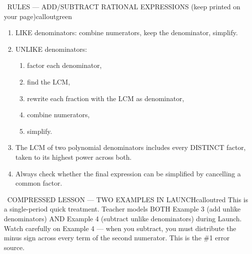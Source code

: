 \documentclass[11pt]{article}
\begin{document}
\begin{callout}{\IconBook\ RULES --- ADD/SUBTRACT RATIONAL EXPRESSIONS (keep printed on your page)}{calloutgreen}
\begin{enumerate}[leftmargin=2.1em,itemsep=1pt,topsep=3pt]
  \item LIKE denominators: combine numerators, keep the denominator, simplify.
  \item UNLIKE denominators:
  \begin{enumerate}[label=(\alph*),leftmargin=1.8em,itemsep=1pt,topsep=2pt]
    \item factor each denominator,
    \item find the LCM,
    \item rewrite each fraction with the LCM as denominator,
    \item combine numerators,
    \item simplify.
  \end{enumerate}
  \item The LCM of two polynomial denominators includes every DISTINCT factor, taken to its highest power across both.
  \item Always check whether the final expression can be simplified by cancelling a common factor.
\end{enumerate}
\end{callout}

\begin{callout}{\IconWarn\ COMPRESSED LESSON --- TWO EXAMPLES IN LAUNCH}{calloutred}
This is a single-period quick treatment. Teacher models BOTH Example 3 (add unlike denominators) AND Example 4 (subtract unlike denominators) during Launch.\\
Watch carefully on Example 4 --- when you subtract, you must distribute the minus sign across every term of the second numerator. This is the \#1 error source.
\end{callout}
\end{document}
